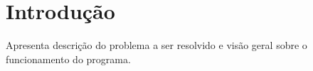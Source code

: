 \chapter{Introdução}
\label{sec-intro}


Apresenta descrição do problema a ser resolvido e visão geral sobre o funcionamento do programa.
